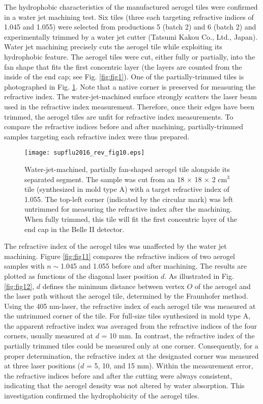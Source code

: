 \documentclass[5p,twocolumn]{elsarticle}
\begin{document}
The hydrophobic characteristics of the manufactured aerogel tiles were confirmed in a water jet machining test. Six tiles (three each targeting refractive indices of 1.045 and 1.055) were selected from productions 5 (batch 2) and 6 (batch 2) and experimentally trimmed by a water jet cutter (Tatsumi Kakou Co., Ltd., Japan). Water jet machining precisely cuts the aerogel tile while exploiting its hydrophobic feature. The aerogel tiles were cut, either fully or partially, into the fan shape that fits the first concentric layer (the layers are counted from the inside of the end cap; see Fig. \ref{fig:fig1}). One of the partially-trimmed tiles is photographed in Fig. \ref{fig:fig10}. Note that a native corner is preserved for measuring the refractive index. The water-jet-machined surface strongly scatters the laser beam used in the refractive index measurement. Therefore, once their edges have been trimmed, the aerogel tiles are unfit for refractive index measurements. To compare the refractive indices before and after machining, partially-trimmed samples targeting each refractive index were thus prepared.

\begin{figure}[t]
\centering 
\texttt{[image: supflu2016\_rev\_fig10.eps]}
\caption{Water-jet-machined, partially fan-shaped aerogel tile alongside its separated segment. The sample was cut from an 18 $\times $ 18 $\times $ 2 cm$^3$ tile (synthesized in mold type A) with a target refractive index of 1.055. The top-left corner (indicated by the circular mark) was left untrimmed for measuring the refractive index after the machining. When fully trimmed, this tile will fit the first concentric layer of the end cap in the Belle II detector.}
\label{fig:fig10}
\end{figure}

The refractive index of the aerogel tiles was unaffected by the water jet machining. Figure \ref{fig:fig11} compares the refractive indices of two aerogel samples with $n \sim $1.045 and 1.055 before and after machining. The results are plotted as functions of the diagonal laser position $d$. As illustrated in Fig. \ref{fig:fig12}, $d$ defines the minimum distance between vertex $O$ of the aerogel and the laser path without the aerogel tile, determined by the Fraunhofer method. Using the 405 nm-laser, the refractive index of each aerogel tile was measured at the untrimmed corner of the tile. For full-size tiles synthesized in mold type A, the apparent refractive index was averaged from the refractive indices of the four corners, usually measured at $d$ = 10 mm. In contrast, the refractive index of the partially trimmed tiles could be measured only at one corner. Consequently, for a proper determination, the refractive index at the designated corner was measured at three laser positions ($d$ = 5, 10, and 15 mm). Within the measurement error, the refractive indices before and after the cutting were always consistent, indicating that the aerogel density was not altered by water absorption. This investigation confirmed the hydrophobicity of the aerogel tiles.
\end{document}
